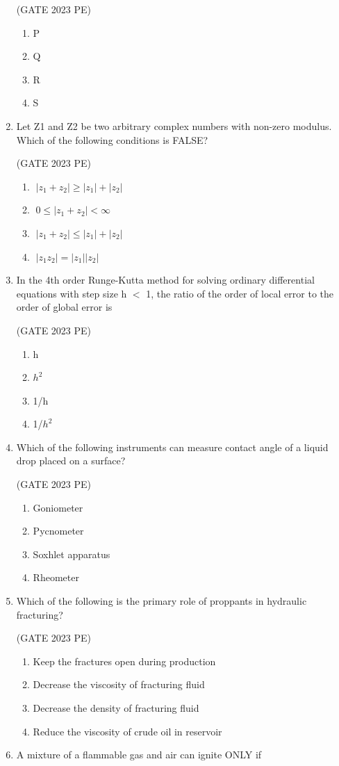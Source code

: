 \documentclass[journal,12pt,onecolumn]{exam}
\theoremstyle{remark}
\begin{document}
\begin{enumerate}
\hfill{(GATE 2023 PE)}\\
\begin{enumerate}
    \item P
    \item Q
    \item R
    \item S
\end{enumerate}
\item Let Z1 and Z2 be two arbitrary complex numbers with non-zero modulus. Which of
the following conditions is FALSE?

\hfill{(GATE 2023 PE)}\\
\begin{enumerate}
    \item $\; |z_1 + z_2| \geq |z_1| + |z_2|$
    \item $\; 0 \leq |z_1 + z_2| < \infty$
    \item $\; |z_1 + z_2| \leq |z_1| + |z_2|$
    \item $\; |z_1 z_2| = |z_1||z_2|$
\end{enumerate}
\item In the 4th order Runge-Kutta method for solving ordinary differential equations with
step size h $<$ 1, the ratio of the order of local error to the order of global error is

\hfill{(GATE 2023 PE)}\\
\begin{enumerate}
    \item h
    \item $h^2$
    \item 1/h
    \item 1/$h^2$
\end{enumerate}
\item Which of the following instruments can measure contact angle of a liquid drop
placed on a surface?

\hfill{(GATE 2023 PE)}\\
\begin{enumerate}
    \item Goniometer
    \item Pycnometer
    \item Soxhlet apparatus
    \item Rheometer
\end{enumerate}
\item Which of the following is the primary role of proppants in hydraulic fracturing?

\hfill{(GATE 2023 PE)}\\
\begin{enumerate}
    \item Keep the fractures open during production
    \item Decrease the viscosity of fracturing fluid
    \item Decrease the density of fracturing fluid
    \item Reduce the viscosity of crude oil in reservoir
\end{enumerate}
\item A mixture of a flammable gas and air can ignite ONLY if


\end{enumerate}
\end{document}
